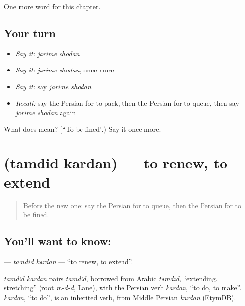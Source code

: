 \begin{grammarlens}[title={What you've built}]
One more word for this chapter.
\end{grammarlens}

\subsection*{Your turn}
\begin{itemize}
\raggedright
  \item \emph{Say it:} \emph{jarime shodan}
  \item \emph{Say it:} \emph{jarime shodan}, once more
  \item \emph{Say it:} say \emph{jarime shodan}
  \item \emph{Recall:} say the Persian for to pack, then the Persian for to queue, then say \emph{jarime shodan} again
\end{itemize}

\begin{tcolorbox}[breakable,colback=teal!4,colframe=teal!35!black,title={Before you move on}]
What does   mean? (\textquotedblleft{}To be fined\textquotedblright{}.) Say it once more.
\end{tcolorbox}
\section[\texorpdfstring{\fa{تمدید} \fa{کردن} (tamdid kardan)}{تمدید کردن (tamdid kardan)}]{  (tamdid kardan) — to renew, to extend}

\label{lesson:FA-C262-tamdid-kardan}



\begin{quote}
Before the new one: say the Persian for to queue, then the Persian for to be fined.
\end{quote}

\subsection*{You'll want to know:  }
\textbf{ } — \emph{tamdid kardan} — \textquotedblleft{}to renew, to extend\textquotedblright{}.

\begin{cousinweb}
\emph{tamdid kardan} pairs \emph{tamdid}, borrowed from Arabic \emph{tamdīd}, \textquotedblleft{}extending, stretching\textquotedblright{} (root \emph{m-d-d}, Lane), with the Persian verb \emph{kardan}, \textquotedblleft{}to do, to make\textquotedblright{}. \emph{kardan}, \textquotedblleft{}to do\textquotedblright{}, is an inherited verb, from Middle Persian \emph{kardan} (EtymDB).
\end{cousinweb}

